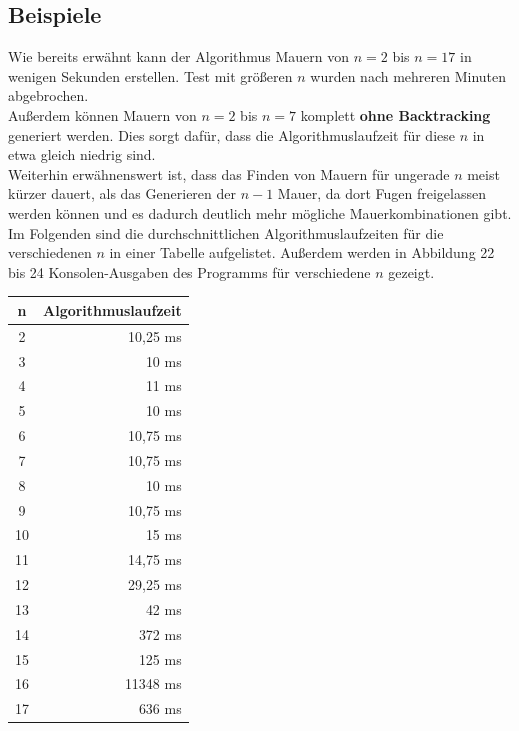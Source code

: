\documentclass[a4paper,12pt]{article}
\begin{document}
\subsection{Beispiele}
Wie bereits erwähnt kann der Algorithmus Mauern von $n = 2$ bis $n = 17$ in wenigen Sekunden erstellen. Test mit größeren $n$ wurden nach mehreren Minuten abgebrochen.
\\[0.4cm]
Außerdem können Mauern von $n = 2$ bis $n = 7$ komplett \textbf{ohne Backtracking} generiert werden. Dies sorgt dafür, dass die Algorithmuslaufzeit für diese $n$ in etwa gleich niedrig sind.
\\[0.4cm]
Weiterhin erwähnenswert ist, dass das Finden von Mauern für ungerade $n$ meist kürzer dauert, als das Generieren der $n - 1$ Mauer, da dort Fugen freigelassen werden können und es dadurch deutlich mehr mögliche Mauerkombinationen gibt.
\\[0.4cm]
Im Folgenden sind die durchschnittlichen Algorithmuslaufzeiten für die verschiedenen $n$ in einer Tabelle aufgelistet. Außerdem werden in Abbildung 22 bis 24 Konsolen-Ausgaben des Programms für verschiedene $n$ gezeigt.
\vspace{0.4cm}
\begin{table}[H]
\begin{center}
\begin{tabular}{cr}
\hline
n  & Algorithmuslaufzeit \\ \hline
2  & 10,25 ms            \\
3  & 10 ms               \\
4  & 11 ms               \\
5  & 10 ms               \\
6  & 10,75 ms            \\
7  & 10,75 ms            \\
8  & 10 ms               \\
9  & 10,75 ms            \\
10 & 15 ms               \\
11 & 14,75 ms            \\
12 & 29,25 ms            \\
13 & 42 ms               \\
14 & 372 ms              \\
15 & 125 ms              \\
16 & 11348 ms            \\
17 & 636 ms             
\end{tabular}
\end{center}
\end{table}
\end{document}
